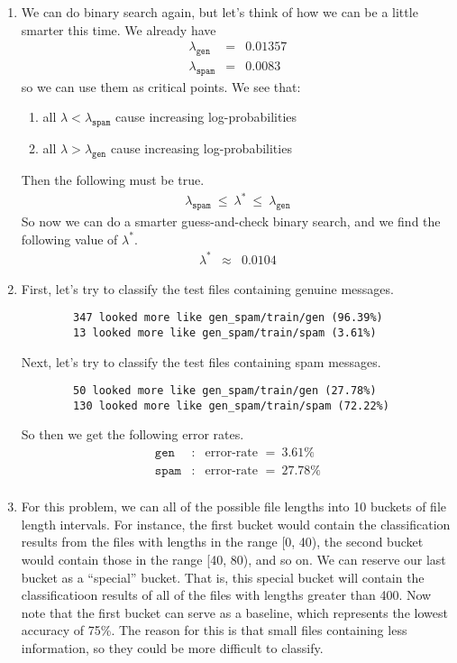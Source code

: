 \documentclass[11pt]{article}
\begin{document}
\begin{enumerate}
\begin{enumerate}[label=(\alph*)]
	\item %
		We can do binary search again, but let's think of how we can be a little smarter this time. We already have 
		\begin{eqnarray*}
			\lambda_{\texttt{gen}} &=& 0.01357 \\
			\lambda_{\texttt{spam}} &=& 0.0083
		\end{eqnarray*}
		so we can use them as critical points. We see that:
		\begin{enumerate}[label=(\roman*)]
		\item all $\lambda < \lambda_{\texttt{spam}}$ cause increasing log-probabilities
		\item all $\lambda > \lambda_{\texttt{gen}}$ cause increasing log-probabilities
		\end{enumerate}
		Then the following must be true. 
		\begin{eqnarray*}
			\lambda_{\texttt{spam}} \ \le \ \lambda^* \ \le \ \lambda_{\texttt{gen}}
		\end{eqnarray*}
		So now we can do a smarter guess-and-check binary search, and we find the following value of $\lambda^*$.
		\begin{eqnarray*}
			\lambda^* &\approx& 0.0104
		\end{eqnarray*}
	\item %
		First, let's try to classify the test files containing genuine messages.
		\begin{lstlisting}
		347 looked more like gen_spam/train/gen (96.39%)
		13 looked more like gen_spam/train/spam (3.61%)
		\end{lstlisting}
		Next, let's try to classify the test files containing spam messages.
		\begin{lstlisting}
		50 looked more like gen_spam/train/gen (27.78%)
		130 looked more like gen_spam/train/spam (72.22%)
		\end{lstlisting}
		So then we get the following error rates.
		\begin{eqnarray*}
			\texttt{gen} &\colon& \text{error-rate } = \ 3.61\% \\
			\texttt{spam} &\colon& \text{error-rate } = \ 27.78\% \\
		\end{eqnarray*}
	\item %
		For this problem, we can all of the possible file lengths into 10 buckets of file length intervals. For instance, the first bucket would contain the classification results from the files with lengths in the range [0, 40), the second bucket would contain those in the range [40, 80), and so on. We can reserve our last bucket as a ``special'' bucket. That is, this special bucket will contain the classificatioon results of all of the files with lengths greater than 400. Now note that the first bucket can serve as a baseline, which represents the lowest accuracy of 75\%. The reason for this is that small files containing less information, so they could be more difficult to classify.

\end{enumerate}
\end{enumerate}
\end{document}
